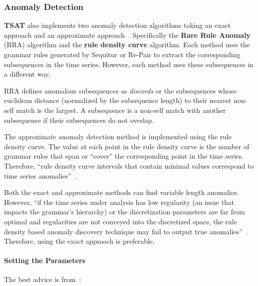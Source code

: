 \documentclass[letterpaper, 12pt]{article}
\newcommand\TSAT{\textbf{TSAT}}
\begin{document}
\subsubsection{Anomaly Detection}




{\TSAT} also implements two anomaly detection algorithms taking an exact approach and an approximate approach~\cite{senin2015time}.  Specifically the \textbf{Rare Rule Anomaly} (RRA) algorithm and the \textbf{rule density curve} algorithm.  Each method uses the grammar rules generated by Sequitur or Re-Pair to extract the corresponding subsequences in the time series.  However, each method uses these subsequences in a different way.

RRA defines anomalous subsequences as \textit{discords} or the subsequences whose euclidean distance (normalized by the subsequence length) to their nearest non-self match is the largest.  A subsequence is a non-self match with another subsequence if their subsequences do not overlap. 

The approximate anomaly detection method is implemented using the rule density curve.  The value at each point in the rule density curve is the number of grammar rules that span or ``cover'' the corresponding point in the time series.  Therefore, ``rule density curve intervals that contain minimal values correspond to time series anomalies''~\cite{senin2015time}.  

Both the exact and approximate methods can find variable length anomalies.  However, ``if the time series under analysis has low regularity (an issue that impacts the grammar’s hierarchy) or the discretization parameters are far from optimal and regularities are not conveyed into the discretized space, the rule density based anomaly discovery technique may fail to output true anomalies''~\cite{senin2015time}.  Therefore, using the exact approach is preferable.
\paragraph{Setting the Parameters} The best advice is from~\cite{senin2015time}:
\end{document}

